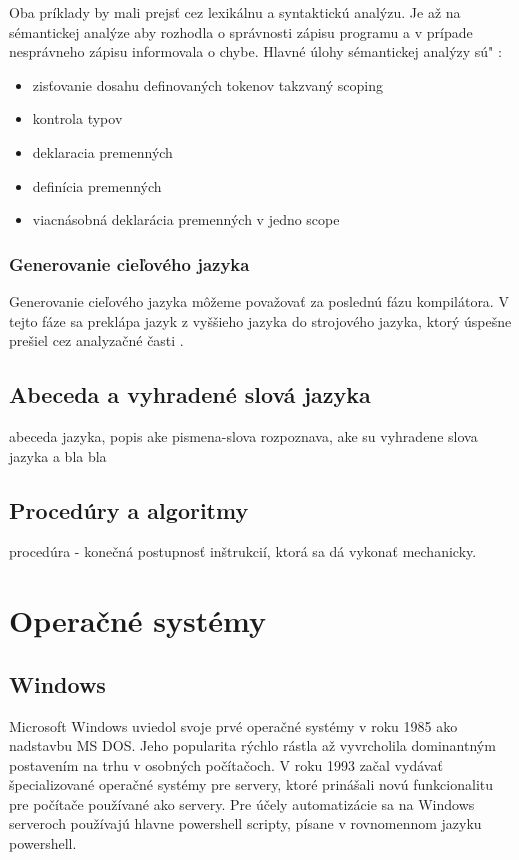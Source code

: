 Oba príklady by mali prejsť cez lexikálnu a syntaktickú analýzu. Je až na sémantickej analýze aby rozhodla o správnosti zápisu programu a v prípade nesprávneho zápisu informovala o chybe.  Hlavné úlohy sémantickej analýzy sú" :

\begin{itemize}
	\item zisťovanie dosahu definovaných tokenov takzvaný scoping
	\item kontrola typov
	\item deklaracia premenných
	\item definícia premenných
	\item viacnásobná deklarácia premenných v jedno scope
\end{itemize}

\subsubsection{Generovanie cieľového jazyka}
\indent Generovanie cieľového jazyka môžeme považovať za poslednú fázu kompilátora. V tejto fáze sa preklápa jazyk z vyššieho jazyka do strojového jazyka, ktorý úspešne prešiel cez analyzačné časti .

\subsection{Abeceda a vyhradené slová jazyka}
abeceda jazyka, popis ake pismena-slova rozpoznava, ake su vyhradene slova jazyka a bla bla


\subsection{Procedúry a algoritmy}
procedúra - konečná postupnosť inštrukcií, ktorá sa dá vykonať mechanicky.

\section{Operačné systémy}

\subsection{Windows}
\indent Microsoft Windows uviedol svoje prvé operačné systémy v roku 1985 ako nadstavbu MS DOS. Jeho popularita rýchlo rástla až vyvrcholila dominantným postavením na trhu v osobných počítačoch. V roku 1993 začal vydávať špecializované operačné systémy pre servery, ktoré prinášali novú funkcionalitu pre počítače používané ako servery. Pre účely automatizácie sa na Windows serveroch používajú hlavne powershell scripty, písane v rovnomennom jazyku powershell.
\newline
